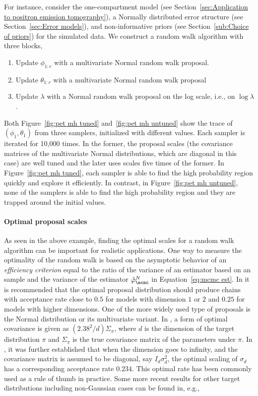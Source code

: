 For instance, consider the one-compartment \pet model (see
Section~\ref{sec:Application to positron emission tomography}), a Normally
distributed error structure (see Section~\ref{sec:Error models}), and
non-informative priors (see Section~\ref{sub:Choice of priors}) for the
simulated data. We construct a random walk algorithm with three blocks,
\begin{enumerate}
  \item Update $\phi_{1:r}$ with a multivariate Normal random walk proposal.
  \item Update $\theta_{1:r}$ with a multivariate Normal random walk proposal
  \item Update $\lambda$ with a Normal random walk proposal on the log scale,
    i.e., on $\log\lambda$.
\end{enumerate}
Both Figure~\ref{fig:pet mh tuned} and~\ref{fig:pet mh untuned} show the trace
of $(\phi_1, \theta_1)$ from three samplers, initialized with different
values. Each sampler is iterated for 10,000 times. In the former, the proposal
scales (the covariance matrices of the multivariate Normal distributions,
which are diagonal in this case) are well tuned and the later uses scales five
times of the former. In Figure~\ref{fig:pet mh tuned}, each sampler is able to
find the high probability region quickly and explore it efficiently. In
contrast, in Figure~\ref{fig:pet mh untuned}, none of the samplers is able to
find the high probability region and they are trapped around the initial
values.




\paragraph{Optimal proposal scales}

As seen in the above example, finding the optimal scales for a random walk
algorithm can be important for realistic applications. One way to measure the
optimality of the random walk is based on the asymptotic behavior of an
\emph{efficiency criterion} equal to the ratio of the variance of an estimator
based on an \iid sample and the variance of the estimator
$\hat\varphi_{\mcmc}^N$ in Equation~\eqref{eq:mcmc est}. In
\cite{Roberts:1997dg} it is recommended that the optimal proposal distribution
should produce chains with acceptance rate close to $0.5$ for models with
dimension $1$ or $2$ and $0.25$ for models with higher dimensions. One of the
more widely used type of proposals is the Normal distribution or its
multivariate variant. In \cite{Gelman:1995vx}, a form of optimal covariance is
given as $(2.38^2/d)\Sigma_{\pi}$, where $d$ is the dimension of the target
distribution $\pi$ and $\Sigma_{\pi}$ is the true covariance matrix of the
parameters under $\pi$. In \cite{Roberts:2001ta}, it was further established
that when the dimension goes to infinity, and the covariance matrix is assumed
to be diagonal, say $I_d\sigma_d^2$, the optimal scaling of $\sigma_d$ has a
corresponding acceptance rate $0.234$. This optimal rate has been commonly
used as a rule of thumb in practice. Some more recent results for other target
distributions including non-Gaussian cases can be found in, e.g.,
\cite{Chris:2009vx,Peter:2011vx}


